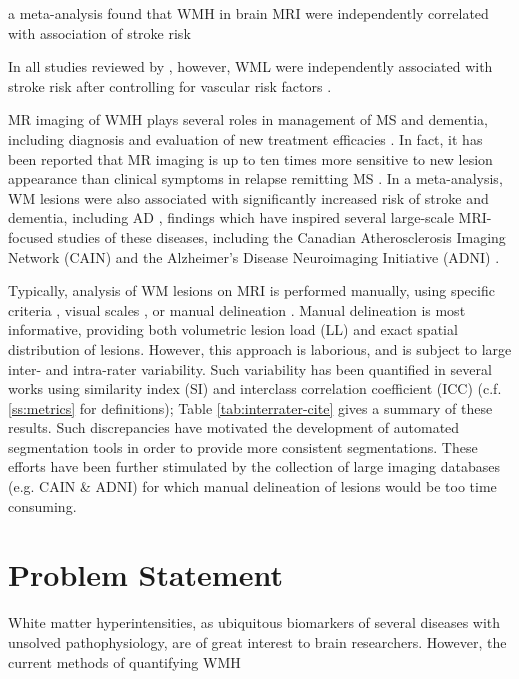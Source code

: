 a \citeyear{Debette2010} meta-analysis found that WMH in brain MRI were independently correlated with association of stroke risk


In all studies reviewed by \citeauthor{Debette2010}, however, WML were independently associated with stroke risk after controlling for vascular risk factors \cite{Debette2010}.



\clearpage
MR imaging of WMH plays several roles in management of MS and dementia, including diagnosis \cite{Polman2011,McKhann2011} and evaluation of new treatment efficacies \cite{Miller1996,Fahrbach2013,Sormani2013,Debette2010a}. In fact, it has been reported that MR imaging is up to ten times more sensitive to new lesion appearance than clinical symptoms in relapse remitting MS \cite{ORiordan1998}. In a \citeyear{Debette2010} meta-analysis, WM lesions were also associated with significantly increased risk of stroke and dementia, including AD \cite{Debette2010}, findings which have inspired several large-scale MRI-focused studies of these diseases, including the Canadian Atherosclerosis Imaging Network (CAIN) \cite{Tardif2013a} and the Alzheimer's Disease Neuroimaging Initiative (ADNI) \cite{Mueller2005}.
\par
Typically, analysis of WM lesions on MRI is performed manually, using specific criteria \cite{Polman2011,McKhann2011}, visual scales \cite{Pantoni2002}, or manual delineation \cite{Egger2017}. Manual delineation is most informative, providing both volumetric lesion load (LL) and exact spatial distribution of lesions. However, this approach is laborious, and is subject to large inter- and intra-rater variability. Such variability has been quantified in several works using similarity index (SI) and interclass correlation coefficient (ICC) (c.f. \ref{ss:metrics} for definitions); Table \ref{tab:interrater-cite} gives a summary of these results. Such discrepancies have motivated the development of automated segmentation tools in order to provide more consistent segmentations. These efforts have been further stimulated by the collection of large imaging databases (e.g. CAIN \& ADNI) for which manual delineation of lesions would be too time consuming.

\section{Problem Statement}
White matter hyperintensities, as ubiquitous biomarkers of several diseases with unsolved pathophysiology, are of great interest to brain researchers. However, the current methods of quantifying WMH 

